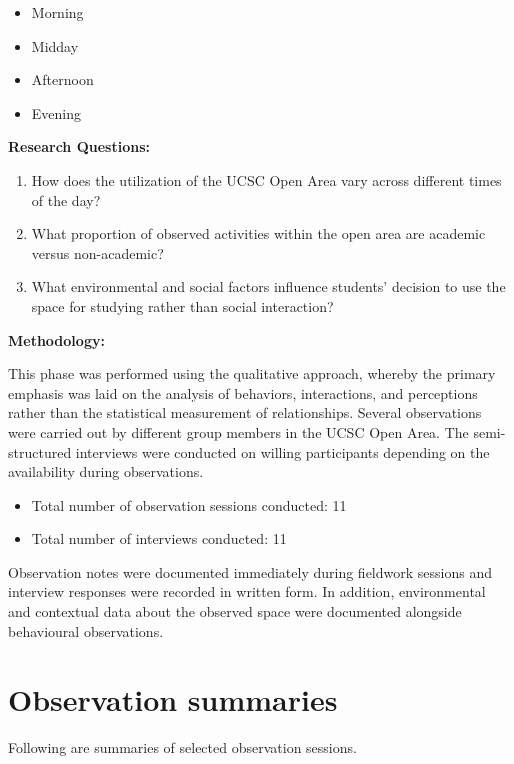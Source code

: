 \documentclass[12pt]{report}
\begin{document}
\begin{itemize}
    \item Morning
    \item Midday
    \item Afternoon
    \item Evening
\end{itemize}

\vspace{0.5cm}
\textbf{Research Questions:}

\begin{enumerate}
    \item How does the utilization of the UCSC Open Area vary across different times of the day?
    \item What proportion of observed activities within the open area are academic versus non-academic?
    \item What environmental and social factors influence students' decision to use the space for studying rather than social interaction?
\end{enumerate}

\vspace{0.5cm}
\textbf{Methodology:}

This phase was performed using the qualitative approach, whereby the primary emphasis was laid on the analysis of behaviors, interactions, and perceptions rather than the statistical measurement of relationships. Several observations were carried out by different group members in the UCSC Open Area. The semi-structured interviews were conducted on willing participants depending on the availability during observations.
\begin{itemize}
    \item Total number of observation sessions conducted: 11
    \item Total number of interviews conducted: 11
\end{itemize}

Observation notes were documented immediately during fieldwork sessions and interview responses were recorded in written form. In addition, environmental and contextual data about the observed space were documented alongside behavioural observations.

\chapter{Observation summaries}

Following are summaries of selected observation sessions.
\end{document}
